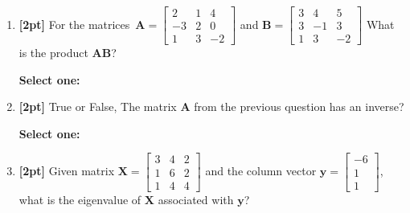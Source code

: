 \documentclass[12pt]{article}
\renewcommand{\circle}{\tikz\draw[black] (0,0) circle (1ex);}
\begin{document}
\begin{enumerate}
\clearpage
    \item \textbf{[2pt]} For the matrices $\mathbf{A}=\begin{bmatrix} 2 & 1 & 4 \\ -3 & 2 & 0 \\ 1 & 3 & -2 \end{bmatrix} $ and $\mathbf{B}=\begin{bmatrix} 3 & 4 & 5 \\ 3 & -1 & 3 \\ 1 & 3 & -2 \end{bmatrix}$
What is the product $\mathbf{AB}$?

    \textbf{Select one:}


    \item \textbf{[2pt]} True or False, The matrix $\mathbf{A}$ from the previous question has an inverse?

    \textbf{Select one:}

    
    \item \textbf{[2pt]} Given matrix $\mathbf{X}=\begin{bmatrix} 3 & 4 & 2 \\ 1 & 6 & 2 \\ 1 & 4 & 4 \end{bmatrix} $ and the column vector $\mathbf{y}=\begin{bmatrix} -6 \\ 1 \\ 1 \end{bmatrix}$, what is the eigenvalue of $\mathbf{X}$ associated with $\mathbf{y}$?


\end{enumerate}
\end{document}
